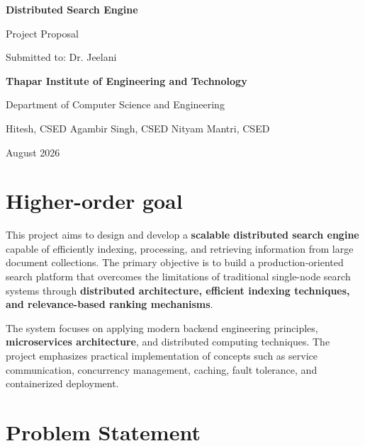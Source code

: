 \documentclass[11pt]{article}
\begin{document}
\begin{center}

{\Large \textbf{Distributed Search Engine}}\\
\vspace{5pt}

{\large Project Proposal}\\
\vspace{6pt}

Submitted to: Dr. Jeelani\\
\vspace{3pt}

\textbf{Thapar Institute of Engineering and Technology}\\
\vspace{4pt}

Department of Computer Science and Engineering\\
\vspace{10pt}

Hitesh, CSED\hspace{20pt}
Agambir Singh, CSED\hspace{20pt}
Nityam Mantri, CSED

\vspace{4pt}

August 2026

\end{center}


\section{Higher-order goal}

This project aims to design and develop a \textbf{scalable distributed search engine} capable of efficiently indexing, processing, and retrieving information from large document collections. The primary objective is to build a production-oriented search platform that overcomes the limitations of traditional single-node search systems through \textbf{distributed architecture, efficient indexing techniques, and relevance-based ranking mechanisms}.

The system focuses on applying modern backend engineering principles, \textbf{microservices architecture}, and distributed computing techniques. The project emphasizes practical implementation of concepts such as service communication, concurrency management, caching, fault tolerance, and containerized deployment.


\section{Problem Statement}
\end{document}
